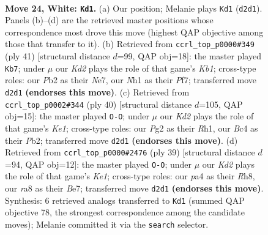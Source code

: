 \documentclass[11pt]{article}
\begin{document}
\clearpage

\begin{figure}[p]\centering
\begin{subfigure}{0.46\textwidth}\centering
\resizebox{\linewidth}{!}{%
\newchessgame
\chessboard[
  setfen={r3kb2/2n1n1pr/6b1/7p/p1B1pP1P/P3R3/1P1K2P1/R5NN w - - 8 24},
  showmover=false,
  pgfstyle=straightmove, color=movearrow, markmove={d2-d1}
]}
\caption{}
\end{subfigure}\hfill
\begin{subfigure}{0.46\textwidth}\centering
\resizebox{\linewidth}{!}{%
\newchessgame
\chessboard[
  setfen={1k1r3r/2p1npp1/1p6/p6p/Pn1PPB2/5P2/3RN1PP/5RK1 b - - 2 21},
  showmover=false,
  pgfstyle=straightmove, color=movearrow, markmove={b8-b7}
]}
\caption{}
\end{subfigure}
\\[4pt]
\begin{subfigure}{0.46\textwidth}\centering
\resizebox{\linewidth}{!}{%
\newchessgame
\chessboard[
  setfen={rn4k1/p2p2bp/5pp1/N2bn3/1p6/4B2P/1P2NPP1/R3K2R w KQ - 0 21},
  showmover=false,
  pgfstyle=straightmove, color=movearrow, markmove={e1-g1}
]}
\caption{}
\end{subfigure}\hfill
\begin{subfigure}{0.46\textwidth}\centering
\resizebox{\linewidth}{!}{%
\newchessgame
\chessboard[
  setfen={r3k2r/p3bpp1/2p1p2p/7P/2NPn3/4B3/PP3PP1/2KR3R b kq - 0 20},
  showmover=false,
  pgfstyle=straightmove, color=movearrow, markmove={e8-g8}
]}
\caption{}
\end{subfigure}
\caption{\textbf{Move 24, White: \texttt{Kd1}.} (a) Our position; Melanie plays \texttt{Kd1} (\texttt{d2d1}). Panels (b)--(d) are the retrieved master positions whose correspondence most drove this move (highest QAP objective among those that transfer to it). (b) Retrieved from \texttt{ccrl\_top\_p0000\#349} (ply 41) [structural distance $d$=99, QAP obj=18]: the master played \texttt{Kb7}; under $\mu$ our \emph{Kd2} plays the role of that game's \emph{Kb1}; cross-type roles: our \emph{P}b2 as their \emph{N}e7, our \emph{N}h1 as their \emph{P}f7; transferred move \texttt{d2d1} \textbf{(endorses this move)}. (c) Retrieved from \texttt{ccrl\_top\_p0002\#344} (ply 40) [structural distance $d$=105, QAP obj=15]: the master played \texttt{O-O}; under $\mu$ our \emph{Kd2} plays the role of that game's \emph{Ke1}; cross-type roles: our \emph{P}g2 as their \emph{R}h1, our \emph{B}c4 as their \emph{P}b2; transferred move \texttt{d2d1} \textbf{(endorses this move)}. (d) Retrieved from \texttt{ccrl\_top\_p0000\#2476} (ply 39) [structural distance $d$=94, QAP obj=12]: the master played \texttt{O-O}; under $\mu$ our \emph{Kd2} plays the role of that game's \emph{Ke1}; cross-type roles: our \emph{p}a4 as their \emph{R}h8, our \emph{r}a8 as their \emph{B}e7; transferred move \texttt{d2d1} \textbf{(endorses this move)}. Synthesis: 6 retrieved analogs transferred to \texttt{Kd1} (summed QAP objective 78, the strongest correspondence among the candidate moves); Melanie committed it via the \texttt{search} selector.}
\label{fig:thought-m46}
\end{figure}
\end{document}
